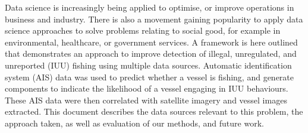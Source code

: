 Data science is increasingly being applied to optimise, or improve operations in business and industry. There is also a movement gaining popularity to apply data science approaches to solve problems relating to social good, for example in environmental, healthcare, or government services. A framework is here outlined that demonstrates an approach to improve detection of illegal, unregulated, and unreported (IUU) fishing using multiple data sources. Automatic identification system (AIS) data was used to predict whether a vessel is fishing, and generate components to indicate the likelihood of a vessel engaging in IUU behaviours. These AIS data were then correlated with satellite imagery and vessel images extracted. This document describes the data sources relevant to this problem, the approach taken, as well as evaluation of our methods, and future work.
